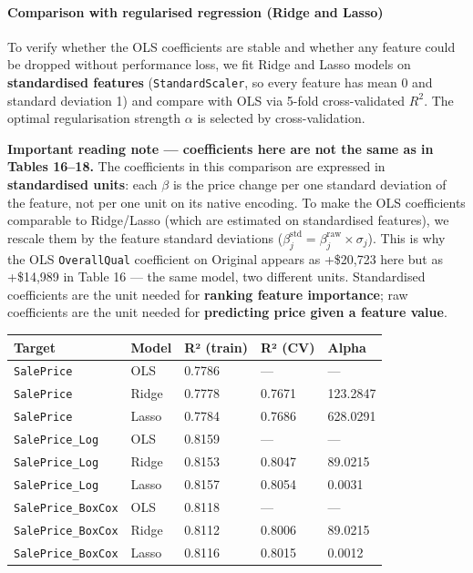 \paragraph{Comparison with regularised regression (Ridge and
Lasso)}\label{comparison-with-regularised-regression-ridge-and-lasso}

To verify whether the OLS coefficients are stable and whether any
feature could be dropped without performance loss, we fit Ridge and
Lasso models on \textbf{standardised features} (\texttt{StandardScaler},
so every feature has mean 0 and standard deviation 1) and compare with
OLS via 5-fold cross-validated \(R^2\). The optimal regularisation
strength \(\alpha\) is selected by cross-validation.

\textbf{Important reading note --- coefficients here are not the same as
in Tables 16--18.} The coefficients in this comparison are expressed in
\textbf{standardised units}: each \(\beta\) is the price change per one
standard deviation of the feature, not per one unit on its native
encoding. To make the OLS coefficients comparable to Ridge/Lasso (which
are estimated on standardised features), we rescale them by the feature
standard deviations
(\(\beta_j^{\text{std}} = \beta_j^{\text{raw}} \times \sigma_j\)). This
is why the OLS \texttt{OverallQual} coefficient on Original appears as
+\$20,723 here but as +\$14,989 in Table 16 --- the same model, two
different units. Standardised coefficients are the unit needed for
\textbf{ranking feature importance}; raw coefficients are the unit
needed for \textbf{predicting price given a feature value}.

\begin{longtable}[]{@{}lllll@{}}
\toprule\noalign{}
Target & Model & R² (train) & R² (CV) & Alpha \\
\midrule\noalign{}
\endhead
\bottomrule\noalign{}
\endlastfoot
\texttt{SalePrice} & OLS & 0.7786 & --- & --- \\
\texttt{SalePrice} & Ridge & 0.7778 & 0.7671 & 123.2847 \\
\texttt{SalePrice} & Lasso & 0.7784 & 0.7686 & 628.0291 \\
\texttt{SalePrice\_Log} & OLS & 0.8159 & --- & --- \\
\texttt{SalePrice\_Log} & Ridge & 0.8153 & 0.8047 & 89.0215 \\
\texttt{SalePrice\_Log} & Lasso & 0.8157 & 0.8054 & 0.0031 \\
\texttt{SalePrice\_BoxCox} & OLS & 0.8118 & --- & --- \\
\texttt{SalePrice\_BoxCox} & Ridge & 0.8112 & 0.8006 & 89.0215 \\
\texttt{SalePrice\_BoxCox} & Lasso & 0.8116 & 0.8015 & 0.0012 \\
\end{longtable}

